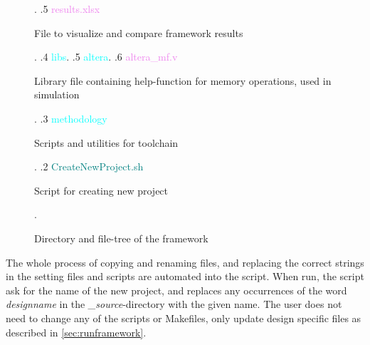 \begin{figure}
\begin{minipage}{0.99\textwidth}
{\begin{minipage}[t]{5.4cm}
                                                            \end{minipage}. 
    .5 \textcolor{violet}{results{.}xlsx} \dotfill \:\:\begin{minipage}[t]{5.4cm}
                                                            File to visualize and compare framework results
                                                            \end{minipage}. 
    .4 \textcolor{cyan}{libs}.
    .5 \textcolor{cyan}{altera}.
    .6 \textcolor{violet}{altera\_mf{.}v} \dotfill \:\:\begin{minipage}[t]{5.4cm}
                                                            Library file containing help-function for memory operations, used in simulation
                                                            \end{minipage}. 
    .3 \textcolor{cyan}{methodology} \dotfill \:\:\begin{minipage}[t]{5.4cm}
                                                            Scripts and utilities for toolchain
                                                            \end{minipage}. 
    .2 \textcolor{teal}{CreateNewProject{.}sh} \dotfill \:\:\begin{minipage}[t]{5.4cm}
                                                            Script for creating new project
                                                            \end{minipage}. 
    }
\end{minipage}
\caption{Directory and file-tree of the framework}
\label{fig:frameworkdirtree}
\end{figure}
The whole process of copying and renaming files, and replacing the correct strings in the setting files and scripts are automated into the script. When run, the script ask for the name of the new project, and replaces any occurrences of the word \textit{designname} in the \textit{\_source}-directory with the given name. The user does not need to change any of the scripts or Makefiles, only update design specific files as described in \cref{sec:runframework}.

